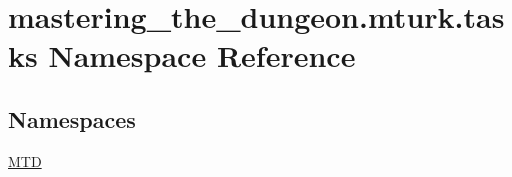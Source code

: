 \hypertarget{namespacemastering__the__dungeon_1_1mturk_1_1tasks}{}\section{mastering\+\_\+the\+\_\+dungeon.\+mturk.\+tasks Namespace Reference}
\label{namespacemastering__the__dungeon_1_1mturk_1_1tasks}
\subsection*{Namespaces}
\begin{DoxyCompactItemize}
\item 
 \hyperlink{namespacemastering__the__dungeon_1_1mturk_1_1tasks_1_1MTD}{M\+TD}
\end{DoxyCompactItemize}
